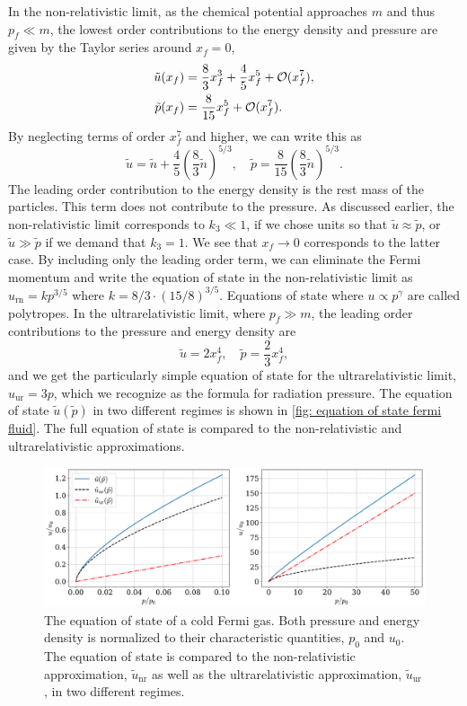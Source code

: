 In the non-relativistic limit, as the chemical potential approaches $m$ and thus $p_f \ll m$, the lowest order contributions to the energy density and pressure are given by the Taylor series around $x_f = 0$,
%
\begin{align}
    \tilde u(x_f) &= \frac{8}{3}x_f^3 + \frac{4}{5} x_f^5 + \mathcal O(x_f^7),  \\
    \tilde p(x_f) &= \frac{8}{15}x_f^5 + \mathcal O(x_f^7).
\end{align}
%
By neglecting terms of order $x_f^7$ and higher, we can write this as
%
\begin{equation}
    \tilde u = \tilde n + \frac{4}{5} \left( \frac{8}{3} \tilde n \right)^{5/3},
    \quad
    \tilde p =  \frac{8}{15} \left( \frac{8}{3} \tilde n \right)^{5/3}.
\end{equation}
%
The leading order contribution to the energy density is the rest mass of the particles.
This term does not contribute to the pressure.
As discussed earlier, the non-relativistic limit corresponds to $k_3 \ll 1$, if we chose units so that $\tilde u \approx \tilde p$, or $\tilde u \gg \tilde p$ if we demand that $k_3 = 1$.
We see that $x_f \rightarrow 0$ corresponds to the latter case.
By including only the leading order term, we can eliminate the Fermi momentum and write the equation of state in the non-relativistic limit as $u_{\mathrm{rn}} = k p^{3/5}$ where $k = 8/3 \cdot (15/8)^{3/5}$.
Equations of state where $u \propto p^{\gamma}$ are called polytropes.
In the ultrarelativistic limit, where $p_f \gg m$, the leading order contributions to the pressure and energy density are
%
\begin{equation}
    \tilde u = 2 x_f^4, \quad \tilde p = \frac{2}{3} x_f^4, 
\end{equation}
%
and we get the particularly simple equation of state for the ultrarelativistic limit, $ u_{\mathrm{ur}} = 3 p $, which we recognize as the formula for radiation pressure.
The equation of state $\tilde u(\tilde p)$ in two different regimes is shown in \autoref{fig: equation of state fermi fluid}.
The full equation of state is compared to the non-relativistic and ultrarelativistic approximations.

\begin{figure}[h]
    \centering
    \includegraphics[width=\textwidth]{../scripts/figurer/fermi_eos.pdf}
    \caption{The equation of state of a cold Fermi gas. Both pressure and energy density is normalized to their characteristic quantities, $p_0$ and $u_0$. The equation of state is compared to the non-relativistic approximation, $\tilde u_{\mathrm{nr}}$ as well as the ultrarelativistic approximation, $\tilde u_{\mathrm{ur}}$, in two different regimes.}
    \label{fig: equation of state fermi fluid}
\end{figure}


